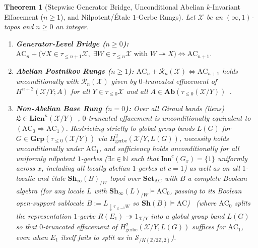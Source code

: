 \documentclass[10pt,twoside,openright]{book}
\theoremstyle{crmplain}
\newtheorem{theorem}{Theorem}[section]
\theoremstyle{crmdef}
\theoremstyle{crmremark}
\begin{document}
\begin{theorem}[Stepwise Generator Bridge, Unconditional Abelian $k$-Invariant Effacement ($n \ge 1$), and Nilpotent/\'Etale $1$-Gerbe Rungs]\label{thm:postnikov-stepwise-proved}%
%
Let $\mathcal{X}$ be an $(\infty, 1)$-topos and $n \ge 0$ an integer.
\begin{enumerate}[label=\textup{(\roman*)},leftmargin=2.0em]
  \item \textbf{Generator-Level Bridge ($n \ge 0$):} $\mathrm{AC}_n + \bigl(\forall X \in \tau_{\le n+1}\mathcal{X},\; \exists W \in \tau_{\le n}\mathcal{X}\text{ with } W \twoheadrightarrow X\bigr) \iff \mathrm{AC}_{n+1}$.
  \item \textbf{Abelian Postnikov Rungs ($n \ge 1$):} $\mathrm{AC}_n + \mathcal{R}_n(\mathcal{X}) \iff \mathrm{AC}_{n+1}$ holds unconditionally with $\mathcal{R}_n(\mathcal{X})$ given by $0$-truncated effacement of $H^{n+2}(\mathcal{X}/Y; A)$ for all $Y \in \tau_{\le 0}\mathcal{X}$ and all $A \in \mathbf{Ab}(\tau_{\le 0}(\mathcal{X}/Y))$~\cite[Constr.~7.2.2.21, Thm.~7.2.2.26]{Lurie09}.
  \item \textbf{Non-Abelian Base Rung ($n = 0$):} Over all Giraud bands (\emph{liens}) $\mathfrak{L} \in \mathbf{Lien}^\kappa(\mathcal{X}/Y)$~\cite[Ch.~IV]{Giraud71}, $0$-truncated effacement is unconditionally equivalent to $(\mathrm{AC}_0 \Rightarrow \mathrm{AC}_1)$. Restricting strictly to global group bands $L(G)$ for $G \in \mathbf{Grp}(\tau_{\le 0}(\mathcal{X}/Y))$ via $H^2_{\mathrm{gerbe}}(\mathcal{X}/Y, L(G))$, necessity holds unconditionally under $\mathrm{AC}_1$, and sufficiency holds unconditionally for all uniformly nilpotent $1$-gerbes ($\exists c \in \mathbb{N}$ such that $\mathrm{Inn}^c(G_x) = \{1\}$ uniformly across $x$, including all locally abelian $1$-gerbes at $c = 1$) as well as on all $1$-localic and \'etale $\mathbf{Sh}_\infty(B)_{/W}$ topoi over $\mathbf{Set}_{\mathrm{AC}}$ with $B$ a complete Boolean algebra (for any locale $L$ with $\mathbf{Sh}_\infty(L)_{/W} \models \mathrm{AC}_0$, passing to its Boolean open-support sublocale $B := L_{{\downarrow}\tau_{\le -1}W}$ so $\mathbf{Sh}(B) \models \mathrm{AC}$)~\cite[Prop.~6.4.5.7]{Lurie09} (where $\mathrm{AC}_0$ splits the representation $1$-gerbe $R(E_1) \twoheadrightarrow 1_{\mathcal{X}/Y}$ into a global group band $L(G)$ so that $0$-truncated effacement of $H^2_{\mathrm{gerbe}}(\mathcal{X}/Y, L(G))$ suffices for $\mathrm{AC}_1$, even when $E_1$ itself fails to split as in $\mathcal{S}_{/K(\mathbb{Z}/2\mathbb{Z}, 2)}$).
\end{enumerate}
\end{theorem}
\end{document}
